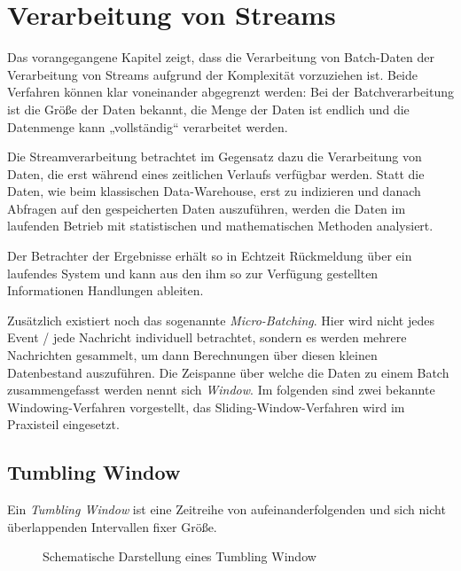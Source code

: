 \documentclass[a4paper,11pt]{scrartcl}
\begin{document}
  \section{Verarbeitung von Streams}
  Das vorangegangene Kapitel zeigt, dass die Verarbeitung von Batch-Daten der
  Verarbeitung von Streams aufgrund der Komplexität vorzuziehen ist. Beide
  Verfahren können klar voneinander abgegrenzt werden: Bei der Batchverarbeitung
  ist die Größe der Daten bekannt, die Menge der Daten ist endlich und die
  Datenmenge kann „vollständig“ verarbeitet werden.

  Die Streamverarbeitung betrachtet im Gegensatz dazu die Verarbeitung von Daten,
  die erst während eines zeitlichen Verlaufs verfügbar werden. Statt die Daten,
  wie beim klassischen Data-Warehouse, erst zu indizieren und danach Abfragen auf
  den gespeicherten Daten auszuführen, werden die Daten im laufenden Betrieb mit
  statistischen und mathematischen Methoden analysiert.

  Der Betrachter der Ergebnisse erhält so in Echtzeit Rückmeldung über ein
  laufendes System und kann aus den ihm so zur Verfügung gestellten Informationen
  Handlungen ableiten.

  Zusätzlich existiert noch das sogenannte \textit{Micro-Batching}.  Hier wird
  nicht jedes Event / jede Nachricht individuell betrachtet, sondern es werden
  mehrere Nachrichten gesammelt, um dann Berechnungen über diesen kleinen
  Datenbestand auszuführen. Die Zeispanne über welche die Daten zu einem Batch
  zusammengefasst werden nennt sich \textit{Window}.\cite[S.~452]{kleppmann17}
  Im folgenden sind zwei bekannte Windowing-Verfahren vorgestellt, das
  Sliding-Window-Verfahren wird im Praxisteil eingesetzt.

  \subsection{Tumbling Window}
  Ein \textit{Tumbling Window} ist eine Zeitreihe von
  aufeinanderfolgenden und sich nicht überlappenden Intervallen fixer
  Größe.
  \begin{figure}[!h]
    \centering
    \caption{Schematische Darstellung eines Tumbling Window}
  \end{figure}
\end{document}
